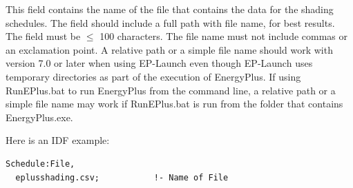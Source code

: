 This field contains the name of the file that contains the data for the shading schedules. The field should include a full path with file name, for best results. The field must be \(\le\) 100 characters. The file name must not include commas or an exclamation point. A relative path or a simple file name should work with version 7.0 or later when using EP-Launch even though EP-Launch uses temporary directories as part of the execution of EnergyPlus. If using RunEPlus.bat to run EnergyPlus from the command line, a relative path or a simple file name may work if RunEPlus.bat is run from the folder that contains EnergyPlus.exe.

Here is an IDF example:

\begin{lstlisting}
Schedule:File,
  eplusshading.csv;           !- Name of File
\end{lstlisting}

